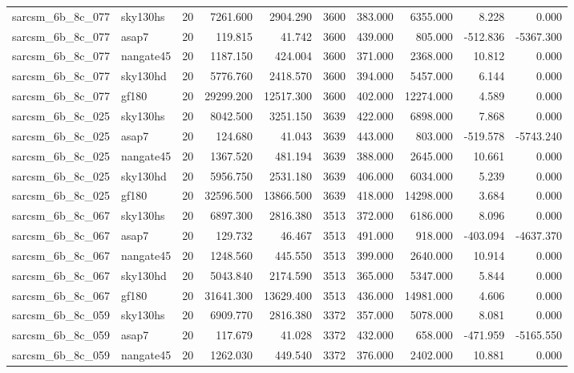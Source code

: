 \documentclass{article}
\begin{document}
\begin{longtable}{llrrrrrrrr}
sarcsm\_6b\_8c\_077 & sky130hs & 20 & 7261.600 & 2904.290 & 3600 & 383.000 & 6355.000 & 8.228 & 0.000 \\
sarcsm\_6b\_8c\_077 & asap7 & 20 & 119.815 & 41.742 & 3600 & 439.000 & 805.000 & -512.836 & -5367.300 \\
sarcsm\_6b\_8c\_077 & nangate45 & 20 & 1187.150 & 424.004 & 3600 & 371.000 & 2368.000 & 10.812 & 0.000 \\
sarcsm\_6b\_8c\_077 & sky130hd & 20 & 5776.760 & 2418.570 & 3600 & 394.000 & 5457.000 & 6.144 & 0.000 \\
sarcsm\_6b\_8c\_077 & gf180 & 20 & 29299.200 & 12517.300 & 3600 & 402.000 & 12274.000 & 4.589 & 0.000 \\
sarcsm\_6b\_8c\_025 & sky130hs & 20 & 8042.500 & 3251.150 & 3639 & 422.000 & 6898.000 & 7.868 & 0.000 \\
sarcsm\_6b\_8c\_025 & asap7 & 20 & 124.680 & 41.043 & 3639 & 443.000 & 803.000 & -519.578 & -5743.240 \\
sarcsm\_6b\_8c\_025 & nangate45 & 20 & 1367.520 & 481.194 & 3639 & 388.000 & 2645.000 & 10.661 & 0.000 \\
sarcsm\_6b\_8c\_025 & sky130hd & 20 & 5956.750 & 2531.180 & 3639 & 406.000 & 6034.000 & 5.239 & 0.000 \\
sarcsm\_6b\_8c\_025 & gf180 & 20 & 32596.500 & 13866.500 & 3639 & 418.000 & 14298.000 & 3.684 & 0.000 \\
sarcsm\_6b\_8c\_067 & sky130hs & 20 & 6897.300 & 2816.380 & 3513 & 372.000 & 6186.000 & 8.096 & 0.000 \\
sarcsm\_6b\_8c\_067 & asap7 & 20 & 129.732 & 46.467 & 3513 & 491.000 & 918.000 & -403.094 & -4637.370 \\
sarcsm\_6b\_8c\_067 & nangate45 & 20 & 1248.560 & 445.550 & 3513 & 399.000 & 2640.000 & 10.914 & 0.000 \\
sarcsm\_6b\_8c\_067 & sky130hd & 20 & 5043.840 & 2174.590 & 3513 & 365.000 & 5347.000 & 5.844 & 0.000 \\
sarcsm\_6b\_8c\_067 & gf180 & 20 & 31641.300 & 13629.400 & 3513 & 436.000 & 14981.000 & 4.606 & 0.000 \\
sarcsm\_6b\_8c\_059 & sky130hs & 20 & 6909.770 & 2816.380 & 3372 & 357.000 & 5078.000 & 8.081 & 0.000 \\
sarcsm\_6b\_8c\_059 & asap7 & 20 & 117.679 & 41.028 & 3372 & 432.000 & 658.000 & -471.959 & -5165.550 \\
sarcsm\_6b\_8c\_059 & nangate45 & 20 & 1262.030 & 449.540 & 3372 & 376.000 & 2402.000 & 10.881 & 0.000 \\

\end{longtable}
\end{document}

